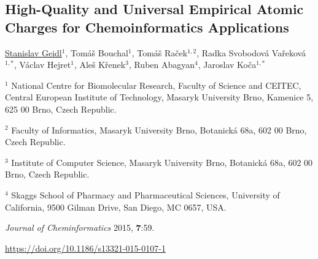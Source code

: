 
\begin{center}
\section{High-Quality and Universal Empirical Atomic
Charges for Chemoinformatics Applications}

\underline{Stanislav Geidl}$^1$, Tomáš Bouchal$^1$, Tomáš Raček$^{1,2}$,
Radka Svobodová Vařeková$^{1, *}$, Václav Hejret$^1$, Aleš Křenek$^3$,
Ruben Abagyan$^4$, Jaroslav Koča$^{1, *}$

\vspace{1cm}

$^1$ National Centre for Biomolecular Research, Faculty of Science and CEITEC,
Central European Institute of Technology, Masaryk University Brno, Kamenice 5,
625 00 Brno, Czech Republic.

$^2$ Faculty of Informatics, Masaryk University Brno, Botanická 68a, 602 00 Brno,
Czech Republic.

$^3$ Institute of Computer Science, Masaryk University Brno, Botanická 68a,
602 00 Brno, Czech Republic.

$^4$ Skaggs School of Pharmacy and Pharmaceutical Sciences, University of
California, 9500 Gilman Drive, San Diego, MC 0657, USA.

\vspace{1cm}

\textit{Journal of Cheminformatics} 2015, \textbf{7}:59.

\vspace{1cm}

\url{https://doi.org/10.1186/s13321-015-0107-1}

\end{center}




